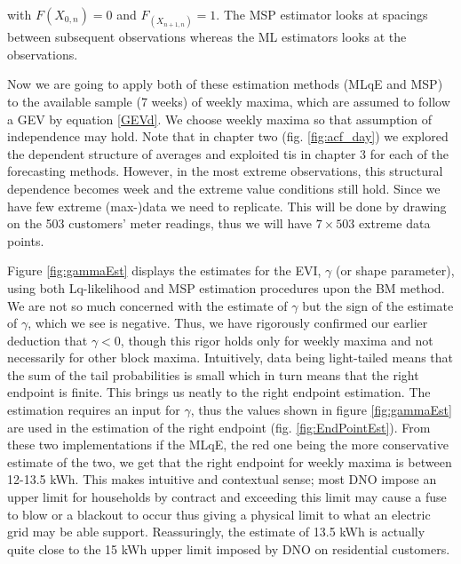 \noindent with $F(X_{0,n}) = 0$ and $F_(X_{n+1,n}) = 1$. %
The MSP estimator looks at spacings between subsequent observations whereas the ML estimators looks at the observations.

Now we are going to apply both of these estimation methods (MLqE and MSP) to the available sample (7 weeks) of weekly maxima, which are assumed to follow a GEV by equation \ref{GEVd}. We choose weekly maxima so that assumption of independence may hold. Note that in chapter two (fig. \ref{fig:acf_day}) we explored the dependent structure of averages and exploited tis in chapter 3 for each of the forecasting methods. However, in the most extreme observations, this structural dependence becomes week and the extreme value conditions still hold. Since we have few extreme (max-)data we need to replicate. This will be done by drawing on the 503 customers' meter readings, thus we will have $7 \times 503$ extreme data points.

Figure \ref{fig:gammaEst} displays the estimates for the EVI, $\gamma$ (or shape parameter), using both Lq-likelihood and MSP estimation procedures upon the BM method. We are not so much concerned with the estimate of $\gamma$ but the sign of the estimate of $\gamma$, which we see is negative. Thus, we have rigorously confirmed our earlier deduction that $\gamma <0$, though this rigor holds only for weekly maxima and not necessarily for other block maxima. Intuitively, data being light-tailed means that the sum of the tail probabilities is small which in turn means that the right endpoint is finite. This brings us neatly to the right endpoint estimation. The estimation requires an input for $\gamma$, thus the values shown in figure \ref{fig:gammaEst} are used in the estimation of the right endpoint (fig. \ref{fig:EndPointEst}). From these two implementations if the MLqE, the red one being the more conservative estimate of the two, we get that the right endpoint for weekly maxima is between 12-13.5 kWh. This makes intuitive and contextual sense; most DNO impose an upper limit for households by contract and exceeding this limit may cause a fuse to blow or a blackout to occur thus giving a physical limit to what an electric grid may be able support.  Reassuringly, the estimate of 13.5 kWh is actually quite close to the 15 kWh upper limit imposed by DNO on residential customers.

